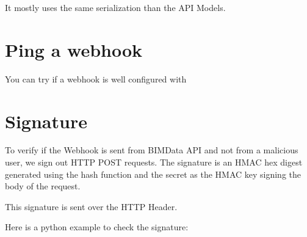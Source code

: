 \documentclass[a4paper,12pt,english]{sphinxmanual}
\begin{document}
It mostly uses the same serialization than the API Models.


\section{Ping a webhook}
\label{\detokenize{guide/webhooks:ping-a-webhook}}
You can try if a webhook is well configured with 


\section{Signature}
\label{\detokenize{guide/webhooks:signature}}
To verify if the Webhook is sent from BIMData API and not from a malicious user, we sign out HTTP POST requests.
The signature is an HMAC hex digest generated using the  hash function
and the secret as the HMAC key signing the body of the request.

This signature is sent over the  HTTP Header.

Here is a python example to check the signature:

%
\begin{sphinxVerbatim}[commandchars=\\\{\}]
 
 

 
      
      
         

      
          

      
\end{sphinxVerbatim}
\end{document}

